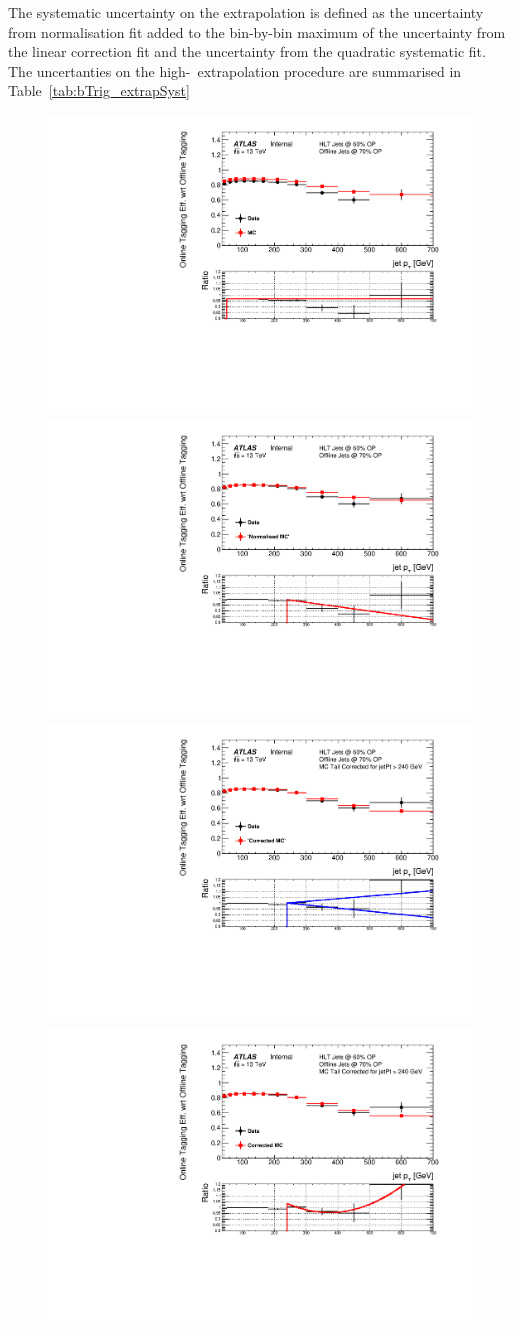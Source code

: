 The systematic uncertainty on the extrapolation is defined as the uncertainty from normalisation fit
added to the bin-by-bin maximum of the uncertainty from the linear correction fit and the uncertainty from the quadratic systematic fit.
The uncertanties on the high-\pT~extrapolation procedure are summarised in Table~\ref{tab:bTrig_extrapSyst}
  
\begin{figure}[!ht]
\begin{center}
\captionsetup[subfigure]{aboveskip=0pt,justification=centering}
   {\includegraphics[width=0.47\linewidth, angle=0]{figs/Trigger/btrigger_old/Full_GRL_bslt2mm_trigReq_effFit_jetPt.pdf} }
   {\includegraphics[width=0.47\linewidth, angle=0]{figs/Trigger/btrigger_old/Full_GRL_bslt2mm_trigReq_effNormFit_jetPt.pdf}} \\
   {\includegraphics[width=0.47\linewidth, angle=0]{figs/Trigger/btrigger_old/Full_GRL_bslt2mm_trigReq_effCorrShapeErr_jetPt.pdf}}
   {\includegraphics[width=0.47\linewidth, angle=0]{figs/Trigger/btrigger_old/Full_GRL_bslt2mm_trigReq_effCorrFitQuad_jetPt.pdf}}

\end{center}
\end{figure}
